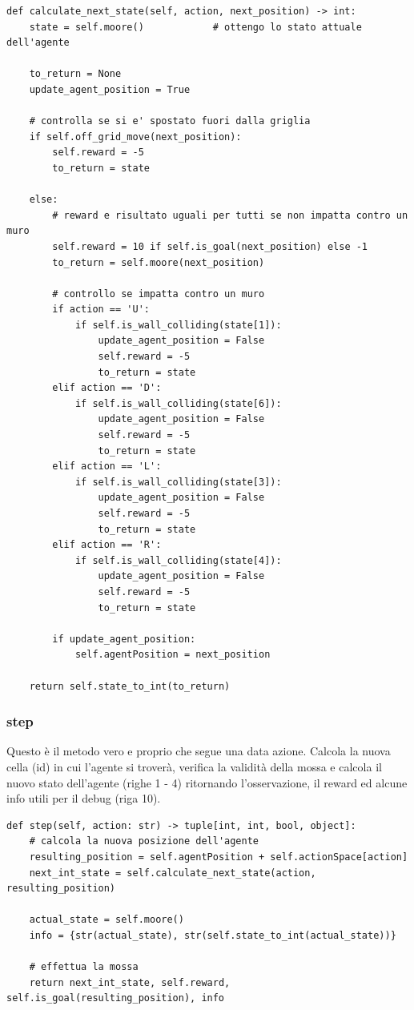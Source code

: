 \begin{lstlisting}[style=python, caption={Codice del metodo calculate\_next\_state}]
def calculate_next_state(self, action, next_position) -> int:
	state = self.moore()            # ottengo lo stato attuale dell'agente

	to_return = None 
	update_agent_position = True 

	# controlla se si e' spostato fuori dalla griglia
	if self.off_grid_move(next_position):
		self.reward = -5
		to_return = state

	else:
		# reward e risultato uguali per tutti se non impatta contro un muro
		self.reward = 10 if self.is_goal(next_position) else -1
		to_return = self.moore(next_position)

		# controllo se impatta contro un muro
		if action == 'U':
			if self.is_wall_colliding(state[1]):
				update_agent_position = False
				self.reward = -5
				to_return = state
		elif action == 'D':
			if self.is_wall_colliding(state[6]):
				update_agent_position = False
				self.reward = -5
				to_return = state
		elif action == 'L':
			if self.is_wall_colliding(state[3]):
				update_agent_position = False
				self.reward = -5
				to_return = state
		elif action == 'R':
			if self.is_wall_colliding(state[4]):
				update_agent_position = False
				self.reward = -5
				to_return = state

		if update_agent_position:
			self.agentPosition = next_position

	return self.state_to_int(to_return)
\end{lstlisting}

\subsubsection{step}
Questo \`{e} il metodo vero e proprio che segue una data azione. Calcola la nuova cella (id) in cui l'agente si trover\`{a}, verifica la validit\`{a} della mossa e calcola il nuovo stato dell'agente (righe 1 - 4) ritornando l'osservazione, il reward ed alcune info utili per il debug (riga 10).\\

\begin{lstlisting}[style=python, caption={Codice del metodo step}]
def step(self, action: str) -> tuple[int, int, bool, object]:
	# calcola la nuova posizione dell'agente
	resulting_position = self.agentPosition + self.actionSpace[action]
	next_int_state = self.calculate_next_state(action, resulting_position)

	actual_state = self.moore()
	info = {str(actual_state), str(self.state_to_int(actual_state))}

	# effettua la mossa
	return next_int_state, self.reward, self.is_goal(resulting_position), info

\end{lstlisting}

